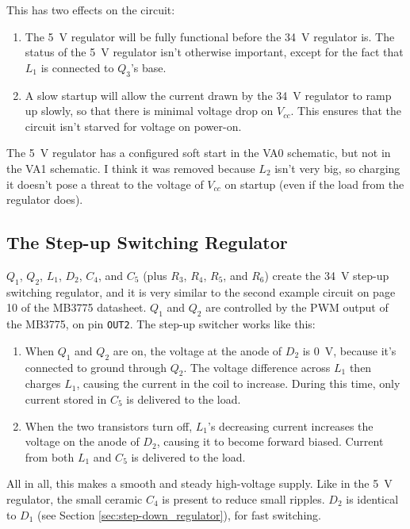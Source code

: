 \documentclass{article}
\newcommand{\Vcc}{$V_{cc}$}
\newcommand{\chippin}{\texttt}
\newcommand{\model}{\textsf}
\begin{document}
This has two effects on the circuit:

\begin{enumerate}
\item The \qty{5}{\volt} regulator will be fully functional before the
  \qty{34}{\volt} regulator is. The status of the \qty{5}{\volt}
  regulator isn't otherwise important, except for the fact that $L_1$
  is connected to $Q_3$'s base.
\item A slow startup will allow the current drawn by the
  \qty{34}{\volt} regulator to ramp up slowly, so that there is
  minimal voltage drop on \Vcc{}. This ensures that the circuit isn't
  starved for voltage on power-on.
\end{enumerate}

The \qty{5}{\volt} regulator has a configured soft start in the
\model{VA0} schematic, but not in the \model{VA1} schematic. I think
it was removed because $L_2$ isn't very big, so charging it doesn't
pose a threat to the voltage of \Vcc{} on startup (even if the load
from the regulator does).

\subsection{The Step-up Switching Regulator}
\label{sec:step-up_regulator}
$Q_1$, $Q_2$, $L_1$, $D_2$, $C_4$, and $C_5$ (plus $R_3$, $R_4$,
$R_5$, and $R_6$) create the \qty{34}{\volt} step-up switching
regulator, and it is very similar to the second example circuit on
page 10 of the \model{MB3775} datasheet. $Q_1$ and $Q_2$ are
controlled by the PWM output of the \model{MB3775}, on pin
\chippin{OUT2}. The step-up switcher works like this:

\begin{enumerate}
\item When $Q_1$ and $Q_2$ are on, the voltage at the anode of $D_2$
  is \qty{0}{\volt}, because it's connected to ground through
  $Q_2$. The voltage difference across $L_1$ then charges $L_1$,
  causing the current in the coil to increase. During this time, only
  current stored in $C_5$ is delivered to the load.
\item When the two transistors turn off, $L_1$'s decreasing current
  increases the voltage on the anode of $D_2$, causing it to become
  forward biased. Current from both $L_1$ and $C_5$ is delivered to
  the load.
\end{enumerate}

All in all, this makes a smooth and steady high-voltage supply. Like
in the \qty{5}{\volt} regulator, the small ceramic $C_4$ is present to
reduce small ripples. $D_2$ is identical to $D_1$ (see Section
\ref{sec:step-down_regulator}), for fast switching.
\end{document}
